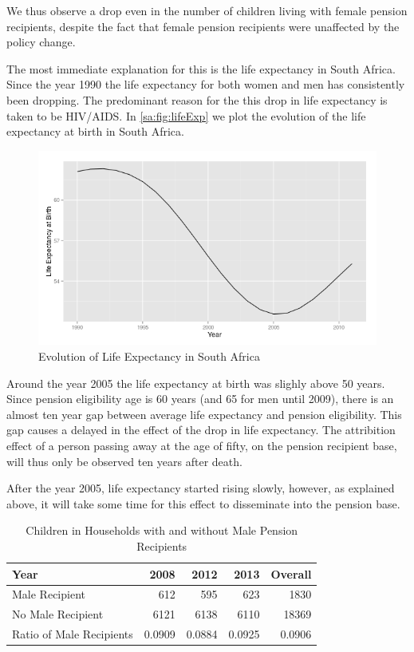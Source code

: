 \begin{refsection}
We thus observe a drop even in the number of children living with female pension recipients,
despite the fact that female pension recipients were unaffected by the policy change.

The most immediate explanation for this is the life expectancy in South Africa.
Since the year 1990 the life expectancy for both women and men has consistently been dropping.
The predominant reason for the this drop in life expectancy is taken to be HIV/AIDS.
In \autoref{sa:fig:lifeExp} we plot the evolution of the life expectancy at birth in South Africa.

\begin{figure}
\centering
\caption{Evolution of Life Expectancy in South Africa}
\label{sa:fig:lifeExp}
\includegraphics[scale=0.5]{lifeExp.png}
\end{figure}

Around the year 2005 the life expectancy at birth was slighly above 50 years.
Since pension eligibility age is 60 years (and 65 for men until 2009),
there is an almost ten year gap between average life expectancy and pension eligibility.
This gap causes a delayed in the effect of the drop in life expectancy.
The attribition effect of a person passing away at the age of fifty, on the pension recipient base,
will thus only be observed ten years after death.

After the year 2005, life expectancy started rising slowly,
however, as explained above, it will take some time for this effect to disseminate into the pension base.




\begin{table}[ht!]
\centering
\caption{Children in Households with and without Male Pension Recipients}
\label{sa:ta:hmr}
    \begin{tabular}{l|rrrr}
    \hline
    Year              & 2008   & 2012   & 2013   & Overall \\
    \hline
    Male Recipient    & 612    & 595    & 623    & 1830    \\
    No Male Recipient & 6121   & 6138   & 6110   & 18369   \\
    Ratio of Male Recipients & 0.0909 & 0.0884 & 0.0925 & 0.0906  \\
    \end{tabular}
\end{table}


\end{refsection}
